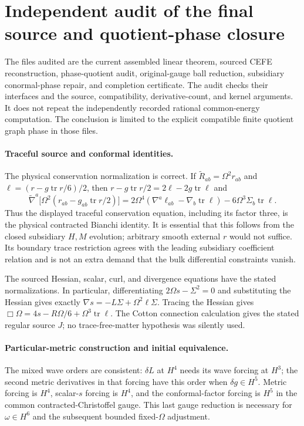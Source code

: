 \section{Independent audit of the final source and quotient-phase closure}
\label{sec:independent-final-source-phase-audit}

The files audited are the current assembled linear theorem, sourced CEFE
reconstruction, phase-quotient audit, original-gauge ball reduction,
subsidiary conormal-phase repair, and completion certificate.  The audit
checks their interfaces and the source, compatibility, derivative-count,
and kernel arguments.  It does not repeat the independently recorded
rational common-energy computation.  The conclusion is limited to the
explicit compatible finite quotient graph phase in those files.

\paragraph{Traceful source and conformal identities.}
The physical conservation normalization is correct.  If
$\widetilde R_{ab}=\Omega^2r_{ab}$ and
$\ell=(r-g\operatorname{tr}r/6)/2$, then
$r-g\operatorname{tr}r/2=2\ell-2g\operatorname{tr}\ell$ and
\[
 \widetilde\nabla^a\bigl[\Omega^2(r_{ab}
 -g_{ab}\operatorname{tr}r/2)\bigr]
 =2\Omega^4(\nabla^a\ell_{ab}-\nabla_b\operatorname{tr}\ell)
 -6\Omega^3\Sigma_b\operatorname{tr}\ell.
\]
Thus the displayed traceful conservation equation, including its factor
three, is the physical contracted Bianchi identity.  It is essential that
this follows from the closed subsidiary $H,M$ evolution; arbitrary smooth
external $r$ would not suffice.  Its boundary trace restriction agrees with
the leading subsidiary coefficient relation and is not an extra demand
that the bulk differential constraints vanish.

The sourced Hessian, scalar, curl, and divergence equations have the stated
normalizations.  In particular, differentiating
$2\Omega s-\Sigma^2=0$ and substituting the Hessian gives exactly
$\nabla s=-L\Sigma+\Omega^2\ell\Sigma$.
Tracing the Hessian gives
$\Box\Omega=4s-R\Omega/6+\Omega^3\operatorname{tr}\ell$.
The Cotton connection calculation gives the stated regular source $J$;
no trace-free-matter hypothesis was silently used.

\paragraph{Particular-metric construction and initial equivalence.}
The mixed wave orders are consistent: $\delta L$ at $H^4$ needs its wave
forcing at $H^3$; the second metric derivatives in that forcing have this
order when $\delta g\in H^5$.  Metric forcing is $H^4$, scalar-$s$
forcing is $H^4$, and the conformal-factor forcing is $H^5$ in the common
contracted-Christoffel gauge.  This last gauge reduction is necessary for
$\omega\in H^6$ and the subsequent bounded fixed-$\Omega$ adjustment.

